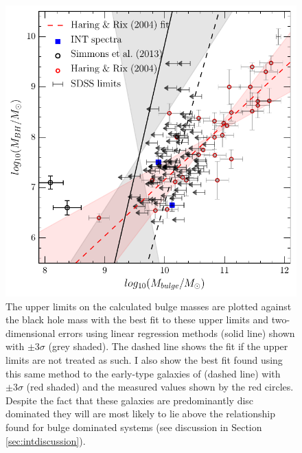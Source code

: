 {\begin{figure}
\centering
\includegraphics[width=\textwidth]{agn/mass_bh_bulge_limits_INT_simmons13_measurements_linmix_fit.pdf}
\caption[Black hole bulge mass relation for the \textsc{discdom} sample]{The upper limits on the calculated bulge masses are plotted against the black hole mass with the best fit to these upper limits and two-dimensional errors using linear regression methods (solid line) shown with $\pm3\sigma$ (grey shaded). The dashed line shows the fit if the upper limits are not treated as such. I also show the best fit found using this same method to the early-type galaxies of \citet{haringrix04} (dashed line) with $\pm3\sigma$ (red shaded) and the measured values shown by the red circles. Despite the fact that these galaxies are predominantly disc dominated they will are most likely to lie above the \citet{haringrix04} relationship found for bulge dominated systems (see discussion in Section \ref{sec:intdiscussion}).
}
\label{fig:bulgevsbh}
\end{figure}

}
